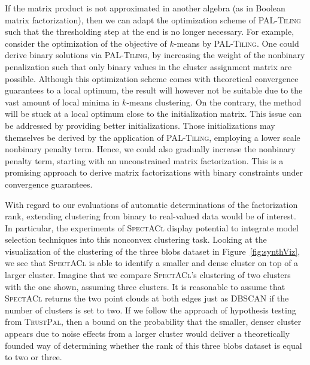 If the matrix product is not approximated in another algebra (as in Boolean matrix factorization), then we can adapt the optimization scheme of \textsc{PAL-Tiling} such that the thresholding step at the end is no longer necessary. For example, consider the optimization of the objective of $k$-means by \textsc{PAL-Tiling}. One could derive binary solutions via \textsc{PAL-Tiling}, by increasing the weight of the nonbinary penalization such that only binary values in the cluster assignment matrix are possible. Although this optimization scheme comes with theoretical convergence guarantees to a local optimum, the result will however not be suitable due to the vast amount of local minima in $k$-means clustering. On the contrary, the method will be stuck at a local optimum close to the initialization matrix. This issue can be addressed by providing better initializations. Those initializations may themselves be derived by the application of \textsc{PAL-Tiling}, employing a lower scale nonbinary penalty term. Hence, we could also gradually increase the nonbinary penalty term, starting with an unconstrained matrix factorization. This is a promising approach to derive matrix factorizations with binary constraints under convergence guarantees.  

With regard to our evaluations of automatic determinations of the factorization rank, extending clustering from binary to real-valued data would be of interest. In particular, the experiments of \textsc{SpectACl} display potential to integrate model selection techniques into this nonconvex clustering task. Looking at the visualization of the clustering of the three blobs dataset in Figure~\ref{fig:synthViz}, we see that \textsc{SpectACl} is able to identify a smaller and dense cluster on top of a larger cluster. Imagine that we compare \textsc{SpectACl}'s clustering of two clusters with the one shown, assuming three clusters. It is reasonable to assume that \textsc{SpectACl} returns the two point clouds at both edges just as DBSCAN if the number of clusters is set to two. If we follow the approach of hypothesis testing from \textsc{TrustPal}, then a bound on the probability that the smaller, denser cluster appears due to noise effects from a larger cluster would deliver a theoretically founded way of determining whether the rank of this three blobs dataset is equal to two or three.